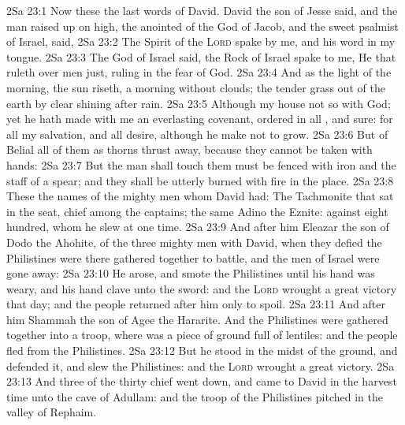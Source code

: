 \vs 2Sa 23:1 Now these  the last words of David. David the son of Jesse said, and the man  raised up on high, the anointed of the God of Jacob, and the sweet psalmist of Israel, said,
\vs 2Sa 23:2 The Spirit of the \textsc{Lord} spake by me, and his word  in my tongue.
\vs 2Sa 23:3 The God of Israel said, the Rock of Israel spake to me, He that ruleth over men  just, ruling in the fear of God.
\vs 2Sa 23:4 And  as the light of the morning,  the sun riseth,  a morning without clouds;  the tender grass  out of the earth by clear shining after rain.
\vs 2Sa 23:5 Although my house  not so with God; yet he hath made with me an everlasting covenant, ordered in all , and sure: for  all my salvation, and all  desire, although he make  not to grow.
\vs 2Sa 23:6 But  of Belial  all of them as thorns thrust away, because they cannot be taken with hands:
\vs 2Sa 23:7 But the man  shall touch them must be fenced with iron and the staff of a spear; and they shall be utterly burned with fire in the  place.
\vs 2Sa 23:8 These  the names of the mighty men whom David had: The Tachmonite that sat in the seat, chief among the captains; the same  Adino the Eznite:  against eight hundred, whom he slew at one time.
\vs 2Sa 23:9 And after him  Eleazar the son of Dodo the Ahohite,  of the three mighty men with David, when they defied the Philistines  were there gathered together to battle, and the men of Israel were gone away:
\vs 2Sa 23:10 He arose, and smote the Philistines until his hand was weary, and his hand clave unto the sword: and the \textsc{Lord} wrought a great victory that day; and the people returned after him only to spoil.
\vs 2Sa 23:11 And after him  Shammah the son of Agee the Hararite. And the Philistines were gathered together into a troop, where was a piece of ground full of lentiles: and the people fled from the Philistines.
\vs 2Sa 23:12 But he stood in the midst of the ground, and defended it, and slew the Philistines: and the \textsc{Lord} wrought a great victory.
\vs 2Sa 23:13 And three of the thirty chief went down, and came to David in the harvest time unto the cave of Adullam: and the troop of the Philistines pitched in the valley of Rephaim.

